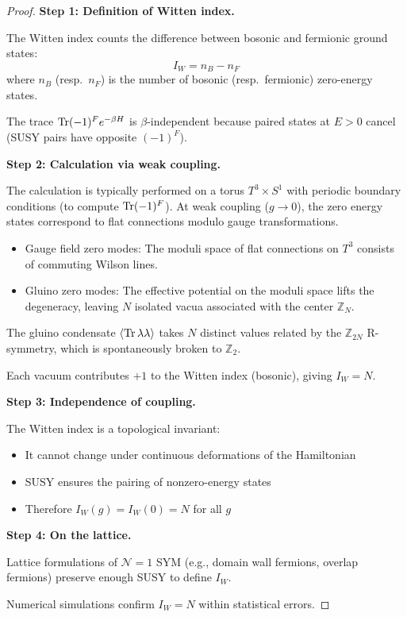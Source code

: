 \begin{proof}
\textbf{Step 1: Definition of Witten index.}

The Witten index counts the difference between bosonic and fermionic ground states:
\[
I_W = n_B - n_F
\]
where $n_B$ (resp.\ $n_F$) is the number of bosonic (resp.\ fermionic) zero-energy states.

The trace $\operatorname{Tr}(-1)^F e^{-\beta H}$ is $\beta$-independent because paired states 
at $E > 0$ cancel (SUSY pairs have opposite $(-1)^F$).

\textbf{Step 2: Calculation via weak coupling.}

The calculation is typically performed on a torus $T^3 \times S^1$ with periodic boundary conditions (to compute $\operatorname{Tr} (-1)^F$). At weak coupling ($g \to 0$), the zero energy states correspond to flat connections modulo gauge transformations.
\begin{itemize}
\item Gauge field zero modes: The moduli space of flat connections on $T^3$ consists of commuting Wilson lines.
\item Gluino zero modes: The effective potential on the moduli space lifts the degeneracy, leaving $N$ isolated vacua associated with the center $\mathbb{Z}_N$.
\end{itemize}

The gluino condensate $\langle \operatorname{Tr}\lambda\lambda \rangle$ takes $N$ distinct values 
related by the $\mathbb{Z}_{2N}$ R-symmetry, which is spontaneously broken to $\mathbb{Z}_2$.

Each vacuum contributes $+1$ to the Witten index (bosonic), giving $I_W = N$.

\textbf{Step 3: Independence of coupling.}

The Witten index is a topological invariant:
\begin{itemize}
\item It cannot change under continuous deformations of the Hamiltonian
\item SUSY ensures the pairing of nonzero-energy states
\item Therefore $I_W(g) = I_W(0) = N$ for all $g$
\end{itemize}

\textbf{Step 4: On the lattice.}

Lattice formulations of $\mathcal{N}=1$ SYM (e.g., domain wall fermions, 
overlap fermions) preserve enough SUSY to define $I_W$.

Numerical simulations confirm $I_W = N$ within statistical errors.
\end{proof}

